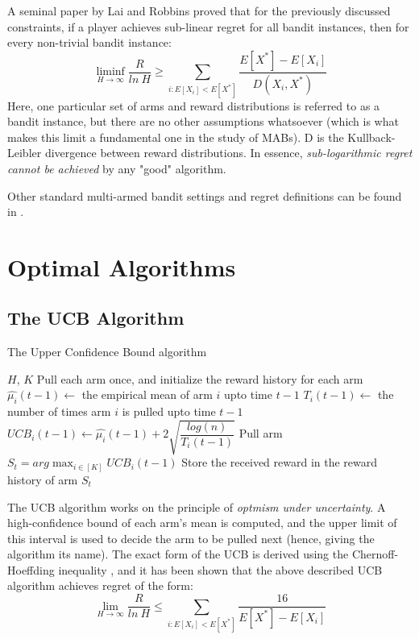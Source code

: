 \documentclass[conference]{IEEEtran}
\begin{document}
A seminal paper by Lai and Robbins \cite{lai_robbins} proved that for the previously discussed constraints, if a player achieves sub-linear regret for all bandit instances, then for every non-trivial bandit instance:
\begin{equation*}
    \liminf_{H \to \infty} \dfrac{R}{ln\ H} \geq \sum_{i: E[X_i] < E[X^*]} \dfrac{E[X^*] - E[X_i]}{D(X_i, X^*)}
\end{equation*}
Here, one particular set of arms and reward distributions is referred to as a bandit instance, but there are no other assumptions whatsoever (which is what makes this limit a fundamental one in the study of MABs). D is the Kullback-Leibler divergence \cite{KL_divergence} between reward distributions. In essence, \textit{sub-logarithmic regret cannot be achieved} by any "good" algorithm.


Other standard multi-armed bandit settings and regret definitions can be found in \cite{lattimore_intro}.

\section{Optimal Algorithms}
\subsection{The UCB Algorithm}
\begin{algorithm}
\caption{The Upper Confidence Bound algorithm \cite{lattimore_ucb}}\label{alg:cap}
\begin{algorithmic}
\Require $H$, $K$
\State Pull each arm once, and initialize the reward history for each arm
    \State $\hat{\mu_i}(t-1) \gets$ the empirical mean of arm $i$ upto time $t-1$
    \State $T_i(t-1) \gets$ the number of times arm $i$ is pulled upto time $t-1$
    \State $UCB_i(t-1) \gets \hat{\mu_i}(t-1) + 2\sqrt{\dfrac{log(n)}{T_i(t-1)}}$
    \EndFor
    \State Pull arm $S_t = arg\max_{i \in [K]} UCB_i(t-1)$
    \State Store the received reward in the reward history of arm $S_t$
\EndFor
\end{algorithmic}
\end{algorithm}

The UCB algorithm works on the principle of \textit{optmism under uncertainty}. A high-confidence bound of each arm's mean is computed, and the upper limit of this interval is used to decide the arm to be pulled next (hence, giving the algorithm its name). The exact form of the UCB is derived using the Chernoff-Hoeffding inequality \cite{chernoffhoeffdinginequality}, and it has been shown \cite{lattimore_ucb} that the above described UCB algorithm achieves regret of the form:
\begin{equation*}
    \lim_{H \to \infty} \dfrac{R}{ln\ H} \leq \sum_{i: E[X_i] < E[X^*]} \dfrac{16}{E[X^*] - E[X_i]}
\end{equation*}
\end{document}
